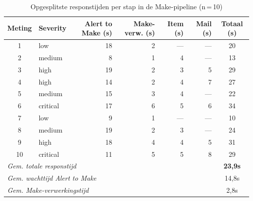 \begin{table}[H]
    \centering
    \caption{Opgesplitste responstijden per stap in de Make-pipeline (n\,=\,10)}
    \label{tab:responstijd}
    \small
    \begin{tabular}{clrrrrc}
        \toprule
        \textbf{Meting} & \textbf{Severity} & \textbf{Alert to Make (s)} & \textbf{Make-verw. (s)} & \textbf{Item (s)} & \textbf{Mail (s)} & \textbf{Totaal (s)} \\
        \midrule
        1  & low      & 18 & 2 & —  & —  & 20 \\
        2  & medium   & 8  & 1 & 4  & —  & 13 \\
        3  & high     & 19 & 2 & 3  & 5  & 29 \\
        4  & high     & 14 & 2 & 4  & 7  & 27 \\
        5  & medium   & 15 & 3 & 4  & —  & 22 \\
        6  & critical & 17 & 6 & 5  & 6  & 34 \\
        7  & low      & 9  & 1 & —  & —  & 10 \\
        8  & medium   & 19 & 2 & 3  & —  & 24 \\
        9  & high     & 18 & 4 & 4  & 5  & 31 \\
        10 & critical & 11 & 5 & 5  & 8  & 29 \\
        \midrule
        \multicolumn{3}{l}{\textit{Gem. totale responstijd}}       & \multicolumn{3}{r}{} & \textbf{23,9s} \\
        \multicolumn{3}{l}{\textit{Gem. wachttijd Alert to Make}}  & \multicolumn{3}{r}{} & 14,8s \\
        \multicolumn{3}{l}{\textit{Gem. Make-verwerkingstijd}}     & \multicolumn{3}{r}{} & 2,8s  \\
        \bottomrule
    \end{tabular}
\end{table}

